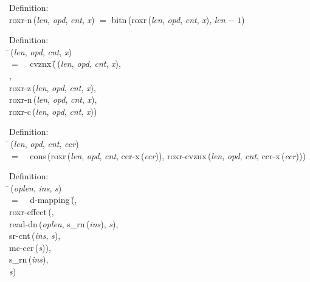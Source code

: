 \begin{tabbing}{\sc Definition}: \\  
{\rm{roxr-n}}\,({\it{len\/}}, {\it{opd\/}}, {\it{cnt\/}}, {\it{x\/}}) $=$ {\rm{bitn}}\,({\rm{roxr}}\,({\it{len\/}}, {\it{opd\/}}, {\it{cnt\/}}, {\it{x\/}}), {\it{len\/}} $-\;1$)
\end{tabbing}

\begin{tabbing}{\sc Definition}: \\  
\=\,({\it{len\/}}, {\it{opd\/}}, {\it{cnt\/}}, {\it{x\/}}) \\ 
$=$$\;\;\;\;${\rm{cvznx}}\,(\=\,({\it{len\/}}, {\it{opd\/}}, {\it{cnt\/}}, {\it{x\/}}), \\ 
{}, \\ 
{\rm{roxr-z}}\,({\it{len\/}}, {\it{opd\/}}, {\it{cnt\/}}, {\it{x\/}}), \\ 
{\rm{roxr-n}}\,({\it{len\/}}, {\it{opd\/}}, {\it{cnt\/}}, {\it{x\/}}), \\ 
{\rm{roxr-c}}\,({\it{len\/}}, {\it{opd\/}}, {\it{cnt\/}}, {\it{x\/}}))\-\-
\end{tabbing}

\begin{tabbing}{\sc Definition}: \\  
\=\,({\it{len\/}}, {\it{opd\/}}, {\it{cnt\/}}, {\it{ccr\/}}) \\ 
$=$$\;\;\;\;${\rm{cons}}\,({\rm{roxr}}\,({\it{len\/}}, {\it{opd\/}}, {\it{cnt\/}}, {\rm{ccr-x}}\,({\it{ccr\/}})), {\rm{roxr-cvznx}}\,({\it{len\/}}, {\it{opd\/}}, {\it{cnt\/}}, {\rm{ccr-x}}\,({\it{ccr\/}})))\-
\end{tabbing}

\begin{tabbing}{\sc Definition}: \\  
\=\,({\it{oplen\/}}, {\it{ins\/}}, {\it{s\/}}) \\ 
$=$$\;\;\;\;${\rm{d-mapping}}\,(\=, \\ 
{\rm{roxr-effect}}\,(\=, \\ 
{\rm{read-dn}}\,({\it{oplen\/}}, {\rm{s\_rn}}\,({\it{ins\/}}), {\it{s\/}}), \\ 
{\rm{sr-cnt}}\,({\it{ins\/}}, {\it{s\/}}), \\ 
{\rm{mc-ccr}}\,({\it{s\/}}))\-, \\ 
{\rm{s\_rn}}\,({\it{ins\/}}), \\ 
{\it{s\/}})\-\-
\end{tabbing}


